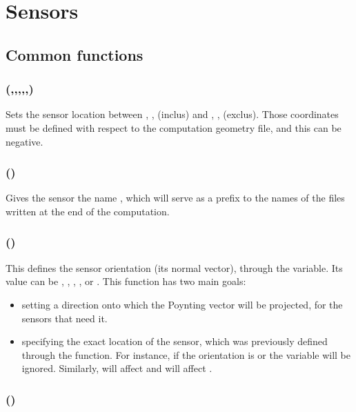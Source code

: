 \section{Sensors}

\label{create_sensor_def}

\subsection{Common functions}

\subsubsection[location]{(,,,,,)}

Sets the sensor location between , ,  (inclus) and , ,  (exclus). Those coordinates must be defined with respect to the computation geometry file, and this can be negative.

\subsubsection[name]{()}

Gives the sensor the name , which will serve as a prefix to the names of the files written at the end of the computation.

\subsubsection[orientation]{()}

This defines the sensor orientation (its normal vector), through the  variable. Its value can be , , , ,  or . This function has two main goals:
\begin{itemize}
	\item setting a direction onto which the Poynting vector will be projected, for the sensors that need it.
	\item specifying the exact location of the sensor, which was previously defined through the  function. For instance, if the orientation is  or  the  variable will be ignored. Similarly,  will affect  and  will affect .
\end{itemize}

\subsubsection[spectrum (one argument)]{()}

